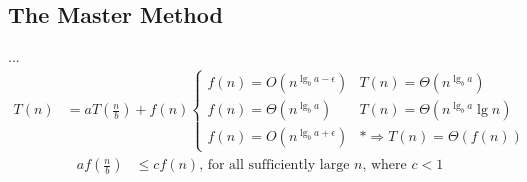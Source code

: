 \subsection{The Master Method}
...
\begin{align}
	T(n) &= a T\left(\frac{n}{b}\right) + f(n)
	\begin{cases}
		f(n) = O(n^{\lg_b a - \epsilon}) & T(n) = \Theta(n^{\lg_b a}) \\
		f(n) = \Theta(n^{\lg_b a}) & T(n) = \Theta(n^{\lg_b a} \lg n) \\
		f(n) = O(n^{\lg_b a + \epsilon}) & * \Rightarrow T(n) = \Theta(f(n))
	\end{cases}
\end{align}
\begin{align}
	a f\left(\frac{n}{b}\right) &\leq c f(n)
	\text{, for all sufficiently large } n \text{, where } c < 1 \tag{*}
\end{align}


